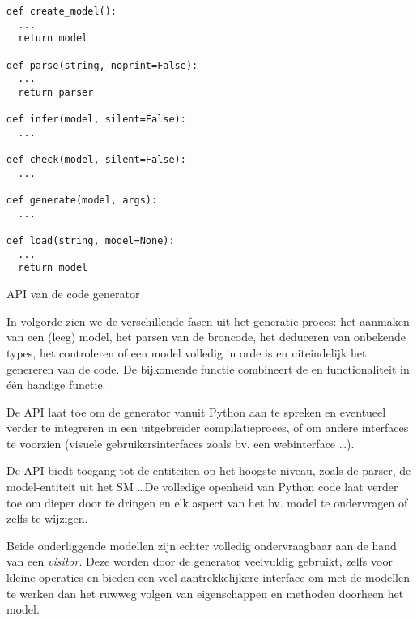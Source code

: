 \begin{listing}[ht]
  \begin{verbatim}
def create_model():
  ...
  return model

def parse(string, noprint=False):
  ...
  return parser

def infer(model, silent=False):
  ...

def check(model, silent=False):
  ...

def generate(model, args):
  ...

def load(string, model=None):
  ...
  return model
  \end{verbatim}
  \vspace{-5mm}
  \caption{API van de code generator}
  \label{lst:codegen-api}
\end{listing}

In volgorde zien we de verschillende fasen uit het generatie proces: het
aanmaken van een (leeg) model, het parsen van de broncode, het deduceren van
onbekende types, het controleren of een model volledig in orde is en
uiteindelijk het genereren van de code. De bijkomende  functie
combineert de  en  functionaliteit in \'e\'en
handige functie.

De API laat toe om de generator vanuit Python aan te spreken en eventueel
verder te integreren in een uitgebreider compilatieproces, of om andere
interfaces te voorzien (visuele gebruikersinterfaces zoals bv. een
webinterface \dots).

De API biedt toegang tot de entiteiten op het hoogste niveau, zoals de parser,
de model-entiteit uit het SM \dots De volledige openheid van Python code laat
verder toe om dieper door te dringen en elk aspect van het bv. model te
ondervragen of zelfs te wijzigen.

Beide onderliggende modellen zijn echter volledig ondervraagbaar aan de hand
van een \emph{visitor}. Deze worden door de generator veelvuldig gebruikt,
zelfs voor kleine operaties en bieden een veel aantrekkelijkere interface om
met de modellen te werken dan het ruwweg volgen van eigenschappen en methoden
doorheen het model.
